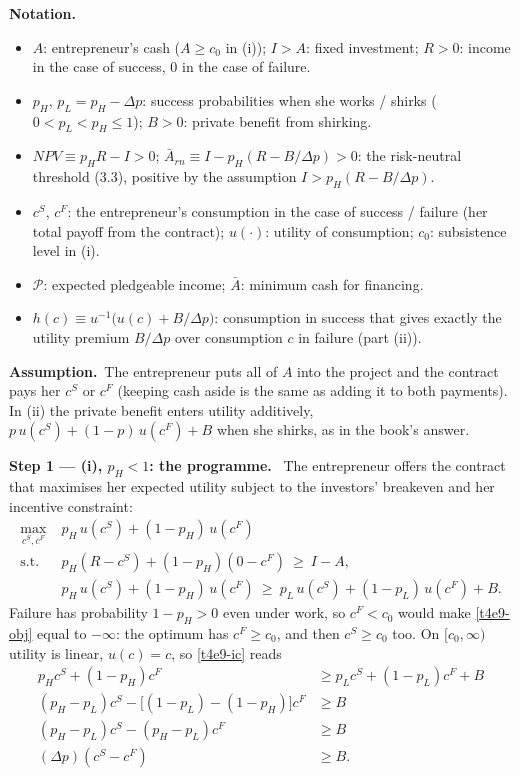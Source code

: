 \documentclass[11pt,a4paper]{article}
\newcommand{\notation}{\par\noindent\textbf{Notation.}}
\newcommand{\step}[2]{\par\medskip\noindent\textbf{Step #1 --- #2.}~}
\newcommand{\assume}{\par\smallskip\noindent\textbf{Assumption.}~}
\begin{document}
\notation
\begin{itemize}
  \item $A$: entrepreneur's cash ($A\ge c_0$ in (i)); $I>A$: fixed investment; $R>0$: income in
        the case of success, $0$ in the case of failure.
  \item $p_H$, $p_L=p_H-\Delta p$: success probabilities when she works / shirks ($0<p_L<p_H\le 1$);
        $B>0$: private benefit from shirking.
  \item $\mathit{NPV}\equiv p_HR-I>0$; $\bar A_{rn}\equiv I-p_H(R-B/\Delta p)>0$: the
        risk-neutral threshold (3.3), positive by the assumption $I>p_H(R-B/\Delta p)$.
  \item $c^S$, $c^F$: the entrepreneur's consumption in the case of success / failure (her total
        payoff from the contract); $u(\cdot)$: utility of consumption; $c_0$: subsistence level in (i).
  \item $\mathcal{P}$: expected pledgeable income; $\bar A$: minimum cash for financing.
  \item $h(c)\equiv u^{-1}\!\big(u(c)+B/\Delta p\big)$: consumption in success that gives exactly the
        utility premium $B/\Delta p$ over consumption $c$ in failure (part (ii)).
\end{itemize}
\assume The entrepreneur puts all of $A$ into the project and the contract pays her $c^S$ or $c^F$
(keeping cash aside is the same as adding it to both payments). In (ii) the private benefit enters
utility additively, $p\,u(c^S)+(1-p)\,u(c^F)+B$ when she shirks, as in the book's answer.

\step{1}{(i), $p_H<1$: the programme} The entrepreneur offers the contract that maximises her
expected utility subject to the investors' breakeven and her incentive constraint:
\begin{align}
  \max_{c^S,c^F}\; & p_H\,u(c^S)+(1-p_H)\,u(c^F) \label{t4e9-obj}\\
  \text{s.t. }\; & p_H(R-c^S)+(1-p_H)(0-c^F)\ \ge\ I-A, \label{t4e9-irl}\\
  & p_H\,u(c^S)+(1-p_H)\,u(c^F)\ \ge\ p_L\,u(c^S)+(1-p_L)\,u(c^F)+B. \label{t4e9-ic}
\end{align}
Failure has probability $1-p_H>0$ even under work, so $c^F<c_0$ would make \eqref{t4e9-obj} equal to
$-\infty$: the optimum has $c^F\ge c_0$, and then $c^S\ge c_0$ too. On $[c_0,\infty)$ utility is
linear, $u(c)=c$, so \eqref{t4e9-ic} reads
\begin{align}
  p_Hc^S+(1-p_H)c^F &\ge p_Lc^S+(1-p_L)c^F+B \nonumber\\
  (p_H-p_L)c^S-\big[(1-p_L)-(1-p_H)\big]c^F &\ge B \nonumber\\
  (p_H-p_L)c^S-(p_H-p_L)c^F &\ge B \nonumber\\
  (\Delta p)(c^S-c^F) &\ge B. \label{t4e9-iclin}
\end{align}
\end{document}
